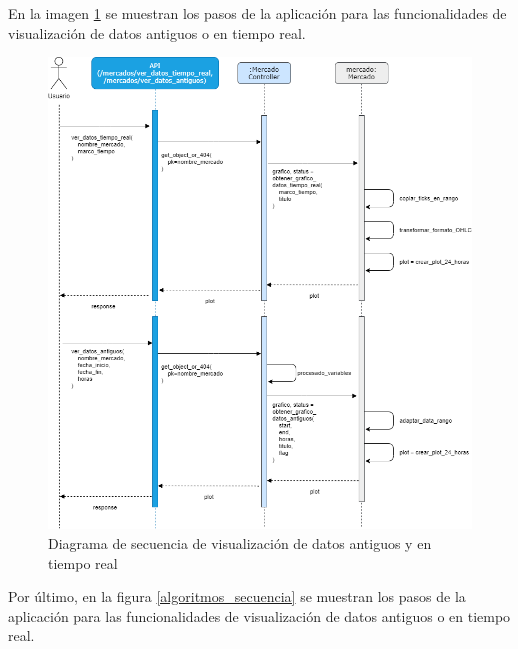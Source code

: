 En la imagen \ref{ver_datos_secuencia} se muestran los pasos de la aplicación para las funcionalidades de visualización de datos antiguos o en tiempo real.\newline

\begin{figure}[h] 
	\includegraphics[width=1.1\textwidth]{imagenes/diagramas_secuencia/ver_datos.png}
	\caption{Diagrama de secuencia de visualización de datos antiguos y en tiempo real} \label{ver_datos_secuencia}
\end{figure}

Por último, en la figura \ref{algoritmos_secuencia} se muestran los pasos de la aplicación para las funcionalidades de visualización de datos antiguos o en tiempo real.\newline

